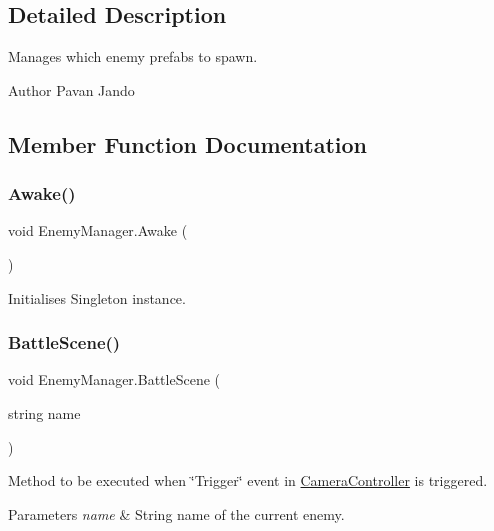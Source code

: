 \subsection{Detailed Description}
Manages which enemy prefabs to spawn. 

\begin{DoxyAuthor}{Author}
Pavan Jando
\end{DoxyAuthor}


\subsection{Member Function Documentation}
\mbox{\label{class_enemy_manager_a9a95e72112a8e624588bb8283d66698e}} 
\subsubsection{\texorpdfstring{Awake()}{Awake()}}
{\footnotesize\ttfamily void Enemy\+Manager.\+Awake (\begin{DoxyParamCaption}{ }\end{DoxyParamCaption})\hspace{0.3cm}{\ttfamily [private]}}



Initialises Singleton instance. 

\mbox{\label{class_enemy_manager_a5071674c83c4cf81fe90dd2655713828}} 
\subsubsection{\texorpdfstring{BattleScene()}{BattleScene()}}
{\footnotesize\ttfamily void Enemy\+Manager.\+Battle\+Scene (\begin{DoxyParamCaption}\item[{string}]{name }\end{DoxyParamCaption})\hspace{0.3cm}{\ttfamily [private]}}



Method to be executed when \char`\"{}\+Trigger\char`\"{} event in \mbox{\hyperlink{class_camera_controller}{Camera\+Controller}} is triggered. 


\begin{DoxyParams}{Parameters}
{\em name} & String name of the current enemy.\\
\hline
\end{DoxyParams}
\mbox{\label{class_enemy_manager_aa24657bcb9c290a4f21c5e861f8f60e1}} 

